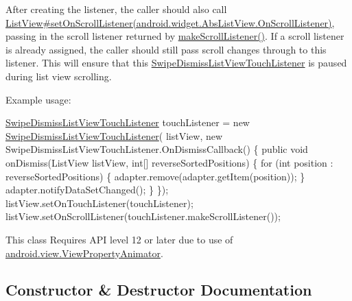 After creating the listener, the caller should also call \hyperlink{}{List\+View\#set\+On\+Scroll\+Listener(android.\+widget.\+Abs\+List\+View.\+On\+Scroll\+Listener)}, passing in the scroll listener returned by \hyperlink{classandroid_1_1app_1_1printerapp_1_1history_1_1_swipe_dismiss_list_view_touch_listener_a8cff088047f50f3b22379d5a1f40ff8a}{make\+Scroll\+Listener()}. If a scroll listener is already assigned, the caller should still pass scroll changes through to this listener. This will ensure that this \hyperlink{classandroid_1_1app_1_1printerapp_1_1history_1_1_swipe_dismiss_list_view_touch_listener}{Swipe\+Dismiss\+List\+View\+Touch\+Listener} is paused during list view scrolling.

Example usage\+:


\begin{DoxyPre}
\hyperlink{classandroid_1_1app_1_1printerapp_1_1history_1_1_swipe_dismiss_list_view_touch_listener}{SwipeDismissListViewTouchListener} touchListener =
        new \hyperlink{classandroid_1_1app_1_1printerapp_1_1history_1_1_swipe_dismiss_list_view_touch_listener}{SwipeDismissListViewTouchListener}(
                listView,
                new SwipeDismissListViewTouchListener.OnDismissCallback() \{
                    public void onDismiss(ListView listView, int[] reverseSortedPositions) \{
                        for (int position : reverseSortedPositions) \{
                            adapter.remove(adapter.getItem(position));
                        \}
                        adapter.notifyDataSetChanged();
                    \}
                \});
listView.setOnTouchListener(touchListener);
listView.setOnScrollListener(touchListener.makeScrollListener());
\end{DoxyPre}


This class Requires A\+PI level 12 or later due to use of \hyperlink{}{android.\+view.\+View\+Property\+Animator}.

\subsection{Constructor \& Destructor Documentation}
\mbox{\label{classandroid_1_1app_1_1printerapp_1_1history_1_1_swipe_dismiss_list_view_touch_listener_ad9370912c19e4ac87d03c71814b4a612}} 
